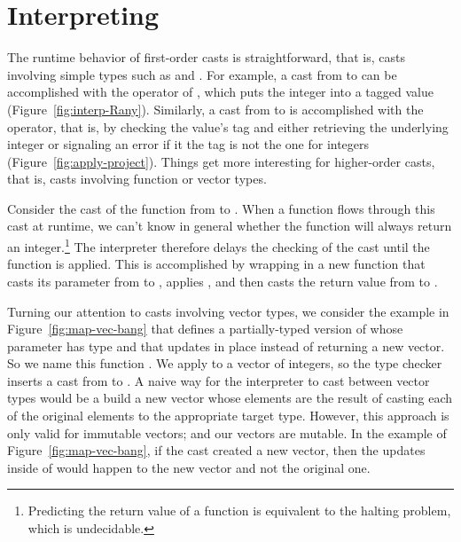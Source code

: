 \documentclass[11pt]{book}
\begin{document}
\clearpage

\section{Interpreting \LangCast{}}
\label{sec:interp-casts}

The runtime behavior of first-order casts is straightforward, that is,
casts involving simple types such as  and
.  For example, a cast from  to 
can be accomplished with the  operator of \LangAny{}, which
puts the integer into a tagged value
(Figure~\ref{fig:interp-Rany}). Similarly, a cast from  to
 is accomplished with the  operator, that
is, by checking the value's tag and either retrieving the underlying
integer or signaling an error if it the tag is not the one for
integers (Figure~\ref{fig:apply-project}).
%
Things get more interesting for higher-order casts, that is, casts
involving function or vector types.

Consider the cast of the function  from  to . When a function flows through
this cast at runtime, we can't know in general whether the function
will always return an integer.\footnote{Predicting the return value of
  a function is equivalent to the halting problem, which is
  undecidable.}  The \LangCast{} interpreter therefore delays the checking
of the cast until the function is applied. This is accomplished by
wrapping  in a new function that casts its parameter
from  to , applies , and then
casts the return value from  to .

Turning our attention to casts involving vector types, we consider the
example in Figure~\ref{fig:map-vec-bang} that defines a
partially-typed version of  whose parameter  has
type  and that updates  in place
instead of returning a new vector. So we name this function
. We apply  to a vector of integers, so
the type checker inserts a cast from 
to . A naive way for the \LangCast{} interpreter to
cast between vector types would be a build a new vector whose elements
are the result of casting each of the original elements to the
appropriate target type. However, this approach is only valid for
immutable vectors; and our vectors are mutable. In the example of
Figure~\ref{fig:map-vec-bang}, if the cast created a new vector, then
the updates inside of  would happen to the new vector
and not the original one.
\end{document}
